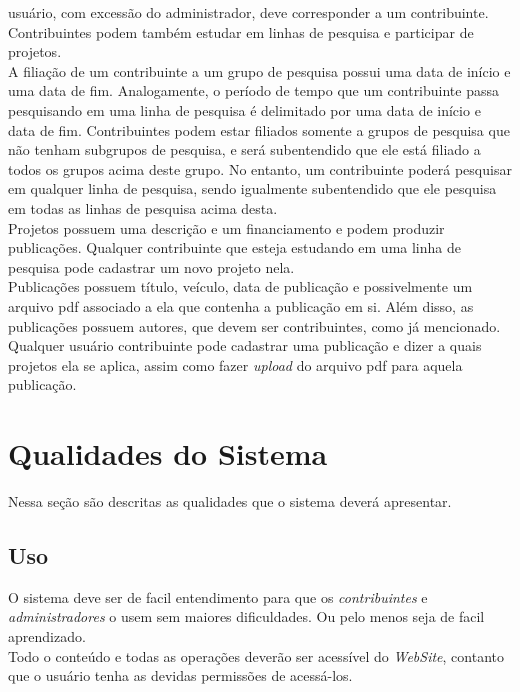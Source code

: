 \documentclass[11pt, a4paper]{article}
\begin{document}
		usuário, com excessão do administrador, deve corresponder a um contribuinte. Contribuintes
		podem também estudar em linhas de pesquisa e participar de projetos.\\
		\indent A filiação de um contribuinte a um grupo de pesquisa possui uma data de início e uma
		data de fim. Analogamente, o período de tempo que um contribuinte passa pesquisando em uma
		linha de pesquisa é delimitado por uma data de início e data de fim. Contribuintes podem
		estar filiados somente a grupos de pesquisa que não tenham subgrupos de pesquisa, e será
		subentendido que ele está filiado a todos os grupos acima deste grupo. No entanto, um
		contribuinte poderá pesquisar em qualquer linha de pesquisa, sendo igualmente subentendido
		que ele pesquisa em todas as linhas de pesquisa acima desta.\\
		\indent Projetos possuem uma descrição e um financiamento e podem produzir publicações.
		Qualquer contribuinte que esteja estudando em uma linha de pesquisa pode cadastrar um novo
		projeto nela.\\
		\indent Publicações possuem título, veículo, data de publicação e possivelmente um arquivo
		pdf associado a ela que contenha a publicação em si. Além disso, as publicações possuem
		autores, que devem ser contribuintes, como já mencionado. Qualquer usuário contribuinte pode
		cadastrar uma publicação e dizer a quais projetos ela se aplica, assim como fazer
		\textit{upload} do arquivo pdf para aquela publicação.
		
	\section{Qualidades do Sistema}
		Nessa seção são descritas as qualidades que o sistema deverá apresentar.
		
		\subsection{Uso}
			O sistema deve ser de facil entendimento para que os 
			\textit{contribuintes} e \textit{administradores} o usem sem maiores 
			dificuldades. Ou pelo menos seja de facil aprendizado.\\
			\indent Todo o conteúdo e todas as operações deverão ser acessível do
			\textit{WebSite}, contanto que o usuário tenha as devidas permissões de acessá-los.
		
\end{document}
